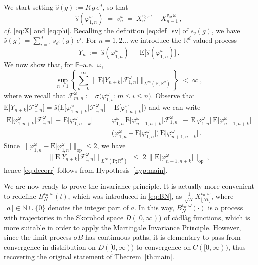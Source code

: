 \documentclass[a4paper,reqno,11pt]{amsart}
\numberwithin{equation}{section}
\newcommand{\bbP}{{\ensuremath{\mathbb P}} }
\newcommand{\cF}{{\ensuremath{\mathcal F}} }
\newcommand{\gs}{\sigma}
\newcommand{\go}{\omega}
\newcommand{\R}{\mathbb{R}}
\newcommand{\N}{\mathbb{N}}
\def\bP{\ensuremath{\bs{\mathrm{P}}}}
\def\bE{\ensuremath{\bs{\mathrm{E}}}}
\def\bs{\boldsymbol}
\renewcommand{\phi}{\varphi}
\begin{document}
We start setting $\hat s(g) := R \, g \, e^d$, so that
\begin{equation} \label{eq:increments}
	\hat s (\phi_{1,n}^\go) \;=\; v_n^\go \;=\; X_n^{v_0, \go} - X_{n-1}^{v_0, \go} \,,
\end{equation}
{\sl cf.} \eqref{eq:X} and \eqref{eq:phi}.
Recalling the definition \eqref{eq:def_sv} of $s_v(g)$, we have
$\hat s(g) = \sum_{i=1}^d s_{e^i}(g) \, e^i$.
For $n=1,2\dots$ we introduce the $\R^d$-valued process 
\begin{equation} \label{eq:Y}
	Y_{n} \;:=\; \hat s (\varphi_{1,n}^\omega) \,-\, \bE\big[ \hat s(\varphi_{1,n}^\omega) \big] \,.
\end{equation}
We now show that, for $\bbP$--a.e.~$\go$,
\begin{equation} \label{eq:decorr}
	\sup_{n \ge 1} \left\{ \sum_{k=0}^\infty 
	\big\| \bE \big[ Y_{n+k} \big| \cF_{1,n}^\go \big] 
	\big\|_{L^\infty(\bP; \R^d)}
	\right\} \; < \; \infty \,,
\end{equation}
where we recall that
$\cF^\go_{m,n} := \gs\big( \phi_{1,i}^\go:\, m \le i \le n \big)$.
Observe that $\bE \big[ Y_{n+k} \big| \cF_{1,n}^\go \big] = 
\hat s \big( \bE \big[ \varphi_{1,n+k}^\omega \big|  \cF_{1,n}^\go \big] 
- \bE \big[ \varphi_{1,n+k}^\omega \big] \big)$ and we can write
\begin{equation}
\begin{split}
	\bE\big[ \varphi_{1,n+k}^\omega \big|  \cF_{1,n}^\go \big] 
	\,-\, \bE \big[ \varphi_{1,n+k}^\omega \big] & \;=\;
	\varphi_{1,n}^\omega\, \bE\big[ \varphi_{n+1,n+k}^\omega \big|  \cF_{1,n}^\go \big] 
	\,-\, \bE \big[ \varphi_{1,n}^\omega \big] 
	\, \bE \big[ \varphi_{n+1,n+k}^\omega \big] \\
	& \;=\; \big( \varphi_{1,n}^\omega - \bE \big[ \varphi_{1,n}^\omega\big] \big) 
	\, \bE\big[ \varphi_{n+1,n+k}^\omega \big] \,.
\end{split}
\end{equation}
Since $\big\| \varphi_{1,n}^\omega - \bE \big[ \varphi_{1,n}^\omega\big] \big\|_{\text{op}} \le 2$,
we have
\begin{equation}
	\big\| \bE \big[ Y_{n+k} \big| \cF_{1,n}^\go \big] 
	\big\|_{L^\infty(\bP; \R^d)} 
	\;\le\; 2 \, \big\| \bE\big[ \varphi_{n+1,n+k}^\omega \big] \big\|_{\text{op}}\,,
\end{equation}
hence \eqref{eq:decorr} follows from Hypothesis~\ref{hyp:main}.

We are now ready to prove the invariance principle.
It is actually more convenient to
redefine $B^{v_0, \go}_{N}(t)$, which was introduced
in \eqref{eq:BN}, as $\frac{1}{\sqrt N} \, X^{v_0, \omega}_{ \lfloor Nt\rfloor }$, where 
$\lfloor a \rfloor \in \N \cup \{0\}$ denotes the integer part of $a$.
In this way, $B^{v_0, \go}_{N}(\cdot)$ is a process with trajectories in the Skorohod space
$D([0, \infty))$ of c\`adl\`ag functions, which is more suitable in order to apply
the Martingale Invariance Principle. However, since the limit process $\gs B$
has continuous paths,
it is elementary to pass from convergence in distribution on $D([0, \infty))$
to convergence on $C([0, \infty))$, thus recovering the original statement of Theorem~\ref{th:main}.
\end{document}
